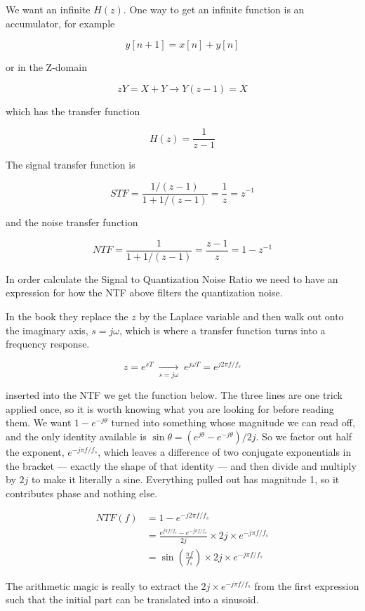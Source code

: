 We want an infinite \(H(z)\). One way to get an infinite function is an
accumulator, for example

\[ y[n+1] = x[n] + y[n]\]

or in the Z-domain

\[ zY = X + Y \rightarrow Y(z-1) = X\]

which has the transfer function

\[H(z) = \frac{1}{z-1}\]

The signal transfer function is

\[STF = \frac{1/(z-1)}{1 + 1/(z-1)} = \frac{1}{z} = z^{-1}\]

and the noise transfer function

\[NTF = \frac{1}{1 + 1/(z-1)} = \frac{z-1}{z} = 1 - z^{-1}\]

In order calculate the Signal to Quantization Noise Ratio we need to
have an expression for how the NTF above filters the quantization noise.

In the book they replace the \(z\) by the Laplace variable and then walk
out onto the imaginary axis, \(s = j\omega\), which is where a transfer
function turns into a frequency response.

\[z = e^{sT} \;\underset{s=j\omega}{\longrightarrow}\;  e^{j\omega T} = e^{j2 \pi f/f_s}\]

inserted into the NTF we get the function below. The three lines are one
trick applied once, so it is worth knowing what you are looking for
before reading them. We want \(1 - e^{-j\theta}\) turned into something
whose magnitude we can read off, and the only identity available is
\(\sin\theta = (e^{j\theta}-e^{-j\theta})/2j\). So we factor out half
the exponent, \(e^{-j\pi f/f_s}\), which leaves a difference of two
conjugate exponentials in the bracket --- exactly the shape of that
identity --- and then divide and multiply by \(2j\) to make it literally
a sine. Everything pulled out has magnitude 1, so it contributes phase
and nothing else.

\[\begin{aligned}
NTF(f) &= 1- e^{-j2 \pi f/f_s} \\
       &= \frac{e^{j \pi f/f_s} -e^{-j \pi f/f_s}}{2j}\times 2j \times e^{-j\pi f/f_s} \\
       &= \sin\left(\frac{\pi f}{f_s}\right) \times 2j \times e^{-j \pi f/f_s}
\end{aligned}\]

The arithmetic magic is really to extract the
\(2j \times e^{-j \pi f/f_s}\) from the first expression such that the
initial part can be translated into a sinusoid.

